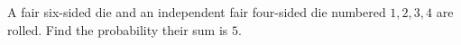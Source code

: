 A fair six-sided die and an independent fair four-sided die numbered $1,2,3,4$ are rolled. Find the probability their sum is $5$.
